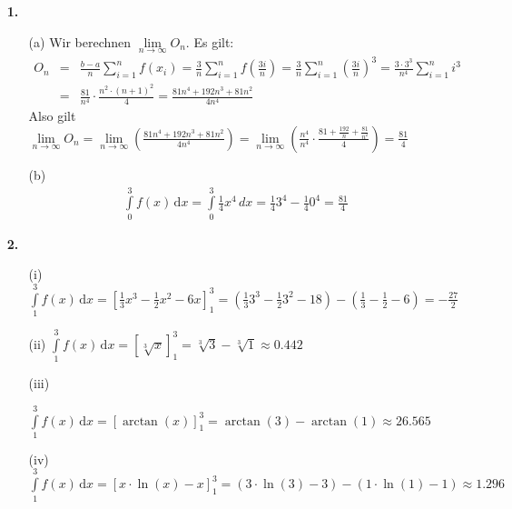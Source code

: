 \documentclass[a4paper,11pt]{scrartcl}
\author{\authorinfo}
\title{\titleinfo}
\date{\today}
\newcommand{\dx}[0]{\, \mathrm{d}x}
\begin{document}
\maketitle
\begin{enumerate}
    \item[\textbf{1.}]
        \begin{enumerate}
            \item[(a)]
                Wir berechnen $\lim\limits_{n \to \infty} O_n$. Es gilt:
                \begin{eqnarray}
                O_n &=& \frac{b-a}{n}\sum_{i=1}^n f(x_i)=\frac{3}{n}\sum_{i=1}^n f\left(\frac{3i}{n}\right)=\frac{3}{n}\sum_{i=1}^n\left(\frac{3i}{n}\right)^3=\frac{3 \cdot 3^3}{n^4}\sum_{i=1}^n i^3 \\ \nonumber
                &=& \frac{81}{n^4} \cdot \frac{n^2\cdot\left(n+1\right)^2}{4}=\frac{81n^4+192n^3+81n^2}{4n^4}
                \end{eqnarray}
                Also gilt $\lim\limits_{n\to \infty} O_n = \lim \limits_{n\to\infty}\left(\frac{81n^4+192n^3+81n^2}{4n^4}\right)= \lim \limits_{n\to\infty}\left(\frac{n^4}{n^4}\cdot\frac{81+\frac{192}{n}+\frac{81}{n^2}}{4}\right)=\frac{81}{4}$
            \item[(b)]
                \begin{eqnarray*}
                    \int\limits_0^3 f(x) \dx = \int\limits_0^3\frac{1}{4}x^4 \, dx = \frac{1}{4}3^4 - \frac{1}{4}0^4= \frac{81}{4}
                \end{eqnarray*}
        \end{enumerate}
    \item[\textbf{2.}]
        \begin{enumerate}
            \item[(i)]
                $\int\limits_1^3 f(x) \dx = [\frac{1}{3}x^3 - \frac{1}{2}x^2 - 6x]_1^3= \left( \frac{1}{3}3^3 - \frac{1}{2}3^2 - 18 \right)- \left( \frac{1}{3} - \frac{1}{2} - 6\right) = - \frac{27}{2}$

            \item[(ii)]
                $\int\limits_1^3 f(x) \dx = [\sqrt[3]{x}]_1^3 = \sqrt[3]{3}-\sqrt[3]{1} \approx 0.442$

            \item[(iii)]
                
                $\int\limits_1^3 f(x) \dx =[\arctan(x)]_1^3=\arctan(3) - \arctan(1) \approx 26.565$
            \item[(iv)]
                $\int\limits_1^3 f(x) \dx = [x \cdot \ln(x) - x]_1^3 = \left( 3 \cdot \ln (3) -3 \right)-\left(1 \cdot \ln (1) - 1 \right) \approx 1.296$
              

\end{enumerate}
\end{enumerate}
\end{document}
